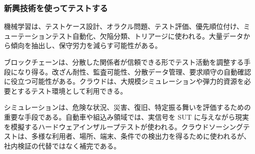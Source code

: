\subsubsection{新興技術を使ってテストする}
機械学習は、テストケース設計、オラクル問題、テスト評価、優先順位付け、ミューテーションテスト自動化、欠陥分類、トリアージに使われる。大量データから傾向を抽出し、保守労力を減らす可能性がある。

ブロックチェーンは、分散した関係者が信頼できる形でテスト活動を調整する手段になり得る。改ざん耐性、監査可能性、分散データ管理、要求順守の自動確認に役立つ可能性がある。クラウドは、大規模シミュレーションや弾力的資源を必要とするテスト環境として利用できる。

シミュレーションは、危険な状況、災害、復旧、特定振る舞いを評価するための重要な手段である。自動車や組込み領域では、実信号を SUT に与えながら現実を模擬するハードウェアインザループテストが使われる。クラウドソーシングテストは、多様な利用者、場所、端末、条件での検出力を得るために使われるが、社内検証の代替ではなく補完である。
